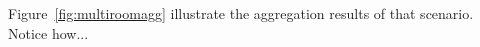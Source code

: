 Figure~\ref{fig:multiroomagg} illustrate the aggregation results of that scenario.  Notice how...





